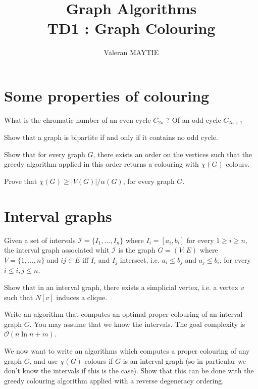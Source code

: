 \documentclass{article}
\title{Graph Algorithms\\TD1 : Graph Colouring}
\author{Valeran MAYTIE}
\date{}
\theoremstyle{plain}
\begin{document}
  \maketitle

  \section{Some properties of colouring}

  \exercice What is the chromatic number of an even cycle $C_{2n}$ ? Of an odd
  cycle $C_{2n+1}$

  \exercice Show that a graph is bipartite if and only if it contains no odd
  cycle.

  \exercice Show that for every graph $G$, there exists an order on the vertices
  such that the greedy algorithm applied in this order returns a colouring with
  $\chi(G)$ colours.

  \exercice Prove that $\chi(G) \geq |V(G)| / \alpha(G)$, for every graph $G$.


  \section{Interval graphs}

  Given a set of intervals $\mathcal{I} = \{I_1, \ldots, I_n\}$ where $I_i =
  [a_i, b_i]$ for every $1 \geq i \geq n$, the interval graph associated whit
  $\mathcal I$ is the graph $G = (V, E)$ where $V = \{1, \ldots, n\}$ and $ij
  \in E$ iff $I_i$ and $I_j$ intersect, i.e. $a_i \leq b_j$ and $a_j \leq b_i$,
  for every $i \leq i, j \leq n$.

  \exercice Show that in an interval graph, there exists a simplicial vertex,
  i.e. a vertex $v$ such that $N[v]$ induces a clique.

  \exercice Write an algorithm that computes an optimal proper colouring of an
  interval graph $G$. You may assume that we know the intervals. The goal
  complexity is $\mathcal O(n\ln n + m)$.

  \exercice We now want to write an algorithms which computes a proper colouring
  of any graph $G$, and use $\chi(G)$ colours if $G$ is an interval graph (so in
  particular we don't know the intervals if this is the case). Show that this
  can be done with the greedy colouring algorithm applied with a reverse
  degeneracy ordering.
 
\end{document}
